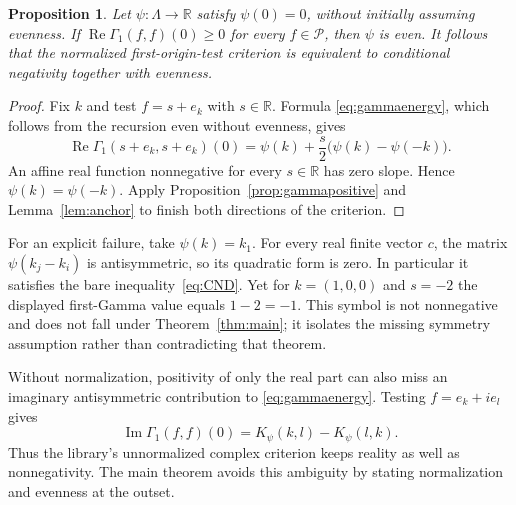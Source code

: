 \documentclass[11pt]{article}
\newtheorem{proposition}[theorem]{Proposition}
\theoremstyle{remark}\newtheorem{remark}[theorem]{Remark}
\newcommand{\R}{\mathbb R}\newcommand{\C}{\mathbb C}
\begin{document}
\begin{proposition}\label{prop:forces-even}
Let $\psi:\Lambda\to\R$ satisfy $\psi(0)=0$, without initially
assuming evenness. If
$\operatorname{Re}\Gamma_1(f,f)(0)\geq0$ for every
$f\in\mathcal P$, then $\psi$ is even. It follows that the
normalized first-origin-test criterion is equivalent to
conditional negativity together with evenness.
\end{proposition}
\begin{proof}
Fix $k$ and test $f=s+e_k$ with $s\in\R$. Formula
\eqref{eq:gammaenergy}, which follows from the recursion even
without evenness, gives
\[
 \operatorname{Re}\Gamma_1(s+e_k,s+e_k)(0)
 =\psi(k)+\frac{s}{2}\bigl(\psi(k)-\psi(-k)\bigr).
\]
An affine real function nonnegative for every $s\in\R$ has zero
slope. Hence $\psi(k)=\psi(-k)$. Apply
Proposition~\ref{prop:gammapositive} and Lemma~\ref{lem:anchor}
to finish both directions of the criterion.
\end{proof}

For an explicit failure, take $\psi(k)=k_1$. For every real
finite vector $c$, the matrix $\psi(k_j-k_i)$ is antisymmetric,
so its quadratic form is zero. In particular it satisfies the
bare inequality~\eqref{eq:CND}. Yet for $k=(1,0,0)$ and $s=-2$
the displayed first-Gamma value equals $1-2=-1$. This symbol
is not nonnegative and does not fall under
Theorem~\ref{thm:main}; it isolates the missing symmetry
assumption rather than contradicting that theorem.

Without normalization, positivity of only the real part can
also miss an imaginary antisymmetric contribution to
\eqref{eq:gammaenergy}. Testing $f=e_k+ie_l$ gives
\[
 \operatorname{Im}\Gamma_1(f,f)(0)
                   =K_\psi(k,l)-K_\psi(l,k).
\]
Thus the library's unnormalized complex criterion keeps reality
as well as nonnegativity. The main theorem avoids this ambiguity
by stating normalization and evenness at the outset.
\end{document}
